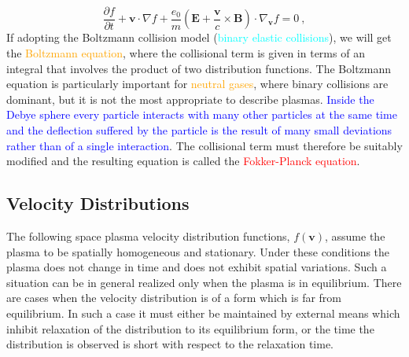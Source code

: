 \documentclass[12pt,a4paper]{article}
\renewcommand{\vec}[1]{\boldsymbol{#1}}
\begin{document}
\begin{equation}
\frac{\partial f}{\partial t} +\vec{v} \cdot\nabla f +\frac{e_0}{m} \left(\vec{E} +\frac{\vec{v}}{c} \times \vec{B}\right) \cdot \nabla_{\vec{v}} f = 0 ~,
\end{equation}
If adopting the Boltzmann collision model (\textcolor{cyan}{binary elastic collisions}), we will get the \textcolor{orange}{Boltzmann equation}, where the collisional term is given in terms of an integral that involves the product of two distribution functions. The Boltzmann equation is particularly important for \textcolor{orange}{neutral gases}, where binary collisions are dominant, but it is not the most appropriate to describe plasmas. \textcolor{blue}{Inside the Debye sphere every particle interacts with many other particles at the same time and the deflection suffered by the particle is the result of many small deviations rather than of a single interaction}. The collisional term must therefore be suitably modified and the resulting equation is called the \textcolor{red}{Fokker-Planck equation}.

\subsection{Velocity Distributions}
\cite{1996bspp.book.....B} The following space plasma velocity distribution functions, $f(\vec{v})$, assume the plasma to be spatially homogeneous and stationary. Under these conditions the plasma does not change in time and does not exhibit spatial variations. Such a situation can be in general realized only when the plasma is in equilibrium. There are cases when the velocity distribution is of a form which is far from equilibrium. In such a case it must either be maintained by external means which inhibit relaxation of the distribution to its equilibrium form, or the time the distribution is observed is short with respect to the relaxation time.
\end{document}
